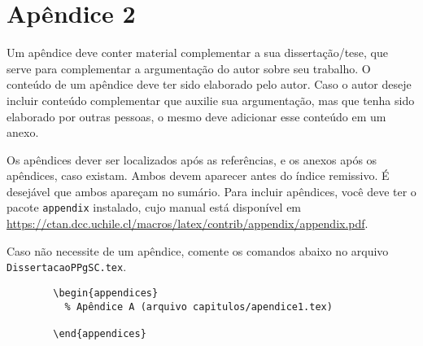 \chapter{Apêndice 2}

Um apêndice deve conter material complementar a sua dissertação/tese, que serve para complementar a argumentação do autor sobre seu trabalho. O conteúdo de um apêndice deve ter sido elaborado pelo autor. Caso o autor deseje incluir conteúdo complementar que auxilie sua argumentação, mas que tenha sido elaborado por outras pessoas, o mesmo deve adicionar esse conteúdo em um anexo.

Os apêndices dever ser localizados após as referências, e os anexos após os apêndices, caso existam. Ambos devem aparecer antes do índice remissivo. É desejável que ambos apareçam no sumário. Para incluir apêndices, você deve ter o pacote \texttt{appendix} \parencite{appendix} instalado, cujo manual está disponível em \url{https://ctan.dcc.uchile.cl/macros/latex/contrib/appendix/appendix.pdf}.

Caso não necessite de um apêndice, comente os comandos abaixo no arquivo \texttt{DissertacaoPPgSC.tex}.

\begin{listing}[ht]
	\begin{verbatim}
		\begin{appendices}
		  % Apêndice A (arquivo capitulos/apendice1.tex)
		  
		\end{appendices}
	\end{verbatim}
	\caption{Exemplo de código \LaTeX{} usado para carregar um arquivo de apêndice.}
	\label{cod:appendix}
\end{listing}